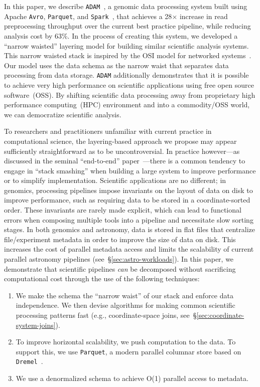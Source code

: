 \documentclass{sig-alternate}
\begin{document}
In this paper, we describe \texttt{ADAM}~\cite{massie13}, a genomic data processing system built using Apache
\texttt{Avro}, \texttt{Parquet}, and \linebreak \texttt{Spark}~\cite{avro, parquet, zaharia10}, that achieves a 28$\times$
increase in read preprocessing throughput over the current best
practice pipeline, while reducing analysis cost by 63\%. In the process of creating this
system, we developed a ``narrow waisted'' layering model for building similar scientific analysis systems.
This narrow waisted stack is inspired by the OSI model for networked systems~\cite{zimmermann80}. Our model
uses the data schema as the narrow waist that separates data processing from data storage. \texttt{ADAM} additionally
demonstrates that it is possible to achieve very high performance on scientific applications using free open source
software~(OSS). By shifting scientific data processing away from proprietary high performance computing~(HPC)
environment and into a commodity/OSS world, we can democratize scientific analysis.

To researchers and practitioners unfamiliar with current practice in computational science, the layering-based approach
we propose may appear sufficiently straightforward as to be uncontroversial. In practice however---as discussed in the
seminal ``end-to-end'' paper~\cite{saltzer84}---there is a common tendency to engage in ``stack smashing'' when building
a large system to improve performance or to simplify implementation. Scientific applications are no different; in genomics,
processing pipelines impose invariants on the layout of data on disk to improve performance, such as requiring data to be
stored in a coordinate-sorted order. These invariants are rarely made explicit, which can lead to functional errors when
composing multiple tools into a pipeline and necessitate slow sorting stages. In both genomics and astronomy, data is
stored in flat files that centralize file/experiment metadata in order to improve the size of data on disk. This increases the
cost of parallel metadata access and limits the scalability of current parallel astronomy pipelines
(see~\S\ref{sec:astro-workloads}). In this paper, we demonstrate that scientific pipelines \emph{can} be decomposed
without sacrificing computational cost through the use of the following techniques:

\begin{enumerate}
\item We make the schema the ``narrow waist'' of our stack and enforce data independence. We then
devise algorithms for making common scientific processing patterns fast (e.g., coordinate-space joins,
see~\S\ref{sec:coordinate-system-joins}).
\item To improve horizontal scalability, we push computation to the data. To support this, we use \texttt{Parquet}, a
modern parallel columnar store based on \texttt{Dremel}~\cite{melnik10}.
\item We use a denormalized schema to achieve O(1) parallel access to metadata.
\end{enumerate}
\end{document}
